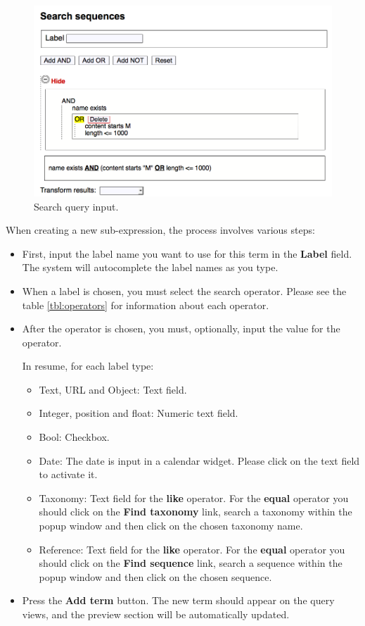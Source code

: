 \begin{figure}[H]
  \centering
    \includegraphics[scale=0.5]{search1.png}
  \caption{Search query input.}
  \label{fig:search1_man}
\end{figure}

When creating a new sub-expression, the process involves various steps:

\begin{itemize}
  \item First, input the label name you want to use for this term in the \textbf{Label} field.
  The system will autocomplete the label names as you type.
  \item When a label is chosen, you must select the search operator. Please see the table \ref{tbl:operators}
  for information about each operator.
  \item After the operator is chosen, you must, optionally, input the value for the operator.

  In resume, for each label type:
  
  \begin{itemize}
     \item Text, URL and Object: Text field.
     \item Integer, position and float: Numeric text field.
     \item Bool: Checkbox.
     \item Date: The date is input in a calendar widget. Please click on the text field to activate it.
     \item Taxonomy: Text field for the \textbf{like} operator. For the \textbf{equal} operator you should
      click on the \textbf{Find taxonomy} link, search a taxonomy within the popup window and then click on
      the chosen taxonomy name.
     \item Reference: Text field for the \textbf{like} operator. For the \textbf{equal} operator you should
      click on the \textbf{Find sequence} link, search a sequence within the popup window and then click on
      the chosen sequence.
  \end{itemize}

  \item Press the \textbf{Add term} button. The new term should appear on the query views, and the preview
  section will be automatically updated.
\end{itemize}

